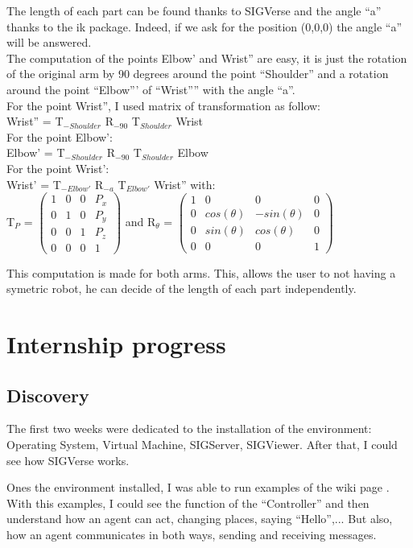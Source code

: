 The length of each part can be found thanks to SIGVerse and the angle ``a'' thanks to the ik package. Indeed, if we ask for the position (0,0,0) the angle ``a'' will be answered.\\
The computation of the points Elbow' and Wrist'' are easy, it is just the rotation of the original arm by 90 degrees around the point ``Shoulder'' and a rotation around the point ``Elbow''' of ``Wrist'''' with the angle ``a''.\\
For the point Wrist'', I used matrix of transformation as follow:\\
Wrist'' = T$_{-Shoulder}$ R$_{-90}$ T$_{Shoulder}$ Wrist\\
For the point Elbow':\\
Elbow' = T$_{-Shoulder}$ R$_{-90}$ T$_{Shoulder}$ Elbow\\
For the point Wrist':\\
Wrist' = T$_{-Elbow'}$ R$_{-a}$ T$_{Elbow'}$ Wrist'' with:\\

T$_{P}$ =
$\begin{pmatrix}
   1 & 0 & 0 & P_x \\
   0 & 1 & 0 & P_y \\
   0 & 0 & 1 & P_z \\
   0 & 0 & 0 & 1
\end{pmatrix}$ and 
R$_{\theta}$ = 
$\begin{pmatrix}
   1 & 0 & 0 & 0 \\
   0 & cos(\theta) & -sin(\theta) & 0 \\
   0 & sin(\theta) & cos(\theta) & 0 \\
   0 & 0 & 0 & 1
\end{pmatrix}$

This computation is made for both arms. This, allows the user to not having a symetric robot, he can decide of the length of each part independently.

\section{Internship progress}
\subsection{Discovery}
The first two weeks were dedicated to the installation of the environment: Operating System, Virtual Machine, SIGServer, SIGViewer. After that, I could see how SIGVerse works. 

Ones the environment installed, I was able to run examples of the wiki page \cite{SIGVerseWiki}. With this examples, I could see the function of the ``Controller'' and then understand how an agent can act, changing places, saying ``Hello'',... But also, how an agent communicates in both ways, sending and receiving messages.\\

